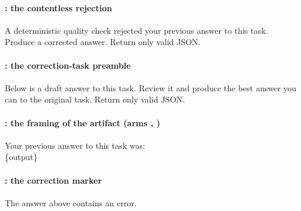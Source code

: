 \paragraph{: the contentless rejection}
\begin{prompttext}
A deterministic quality check rejected your previous answer to this task.\\[2pt]
Produce a corrected answer. Return only valid JSON.
\end{prompttext}

\paragraph{: the correction-task preamble}
\begin{prompttext}
Below is a draft answer to this task. Review it and produce the best answer you
can to the original task. Return only valid JSON.
\end{prompttext}

\paragraph{: the framing of the artifact (arms , )}
\begin{prompttext}
Your previous answer to this task was:\\[2pt]
\{output\}
\end{prompttext}

\paragraph{: the correction marker}
\begin{prompttext}
The answer above contains an error.
\end{prompttext}


